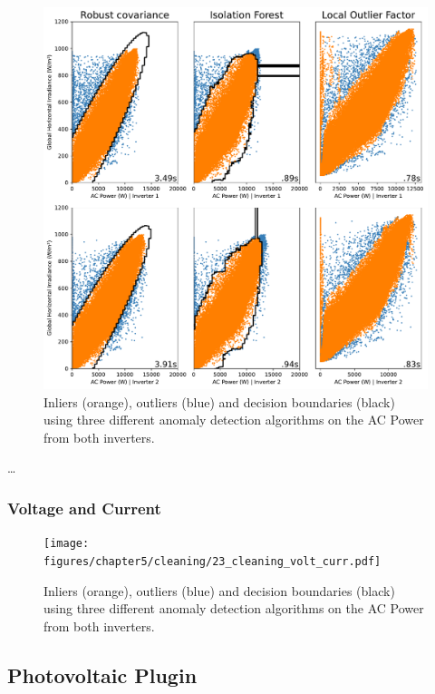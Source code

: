 \begin{figure}[h!]
    \centering
    \includegraphics[width=\textwidth]{figures/chapter5/cleaning/22_cleaning_horizontal_irrad.pdf}
    \caption{Inliers (orange), outliers (blue) and decision boundaries (black) using three different anomaly detection algorithms on the AC Power from both inverters.}
    \label{fig:clean_horizontal_irrad}
\end{figure}


\dots

\subsubsection{Voltage and Current}

\begin{figure}[h!]
    \centering
    \texttt{[image: figures/chapter5/cleaning/23\_cleaning\_volt\_curr.pdf]}
    \caption{Inliers (orange), outliers (blue) and decision boundaries (black) using three different anomaly detection algorithms on the AC Power from both inverters.}
    \label{fig:clean_volt_curr}
\end{figure}

\subsection{Photovoltaic Plugin}

